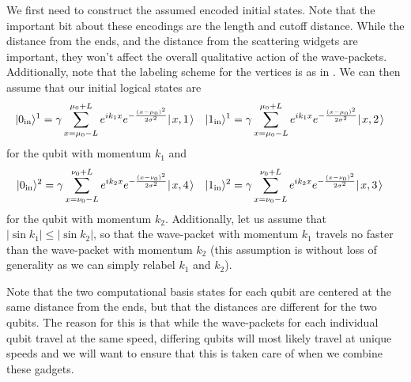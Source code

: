 \documentclass[../thesis-main/thesis-main]{subfiles}
\begin{document}
We first need to construct the assumed encoded initial states.  Note that the important bit about these encodings are the length and cutoff distance.  While the distance from the ends, and the distance from the scattering widgets are important, they won't affect the overall qualitative action of the wave-packets.  Additionally, note that the labeling scheme for the vertices is as in .  We can then assume that our initial logical states are
\begin{align}
  |0_{\text{in}}\rangle^{1}&=  \gamma \sum_{x = \mu_0 -L} ^{\mu_0 + L}  e^{i k_{1} x} e^{- \frac{(x-\mu_0)^2}{2\sigma^2}} |\mspace{2mu} x,1 \mspace{2mu} \rangle & 
  |1_\text{in}\rangle^1&= \gamma \sum_{x = \mu_0 -L} ^{\mu_0 + L}  e^{i k_{1} x} e^{- \frac{(x-\mu_0)^2}{2\sigma^2}} |\mspace{2mu} x,2 \mspace{2mu} \rangle \label{eq:cd_input_1}
\end{align}
for the qubit with momentum $k_1$ and
\begin{align}
  |0_{\text{in}}\rangle^2&=\gamma \sum_{x = \nu_0 -L} ^{\nu_0 + L}  e^{i k_{2} x} e^{- \frac{(x-\nu_0)^2}{2\sigma^2}} |\mspace{2mu} x,4 \mspace{2mu} \rangle&
  |1_\text{in}\rangle^2&=\gamma \sum_{x = \nu_0 -L} ^{\nu_0 + L}  e^{i k_{2} x} e^{- \frac{(x-\nu_0)^2}{2\sigma^2}} |\mspace{2mu} x,3 \mspace{2mu} \rangle \label{eq:cd_input_2}
\end{align}
 for the qubit with momentum $k_2$.  Additionally, let us assume that $|\sin k_1| \leq |\sin k_2|$, so that the wave-packet with momentum $k_1$ travels no faster than the wave-packet with momentum $k_2$ (this assumption is without loss of generality as we can simply relabel $k_1$ and $k_2$).
 
 Note that the two computational basis states for each qubit are centered at the same distance from the ends, but that the distances are different for the two qubits.  The reason for this is that while the wave-packets for each individual qubit travel at the same speed, differing qubits will most likely travel at unique speeds and we will want to ensure that this is taken care of when we combine these gadgets.
 
\end{document}
